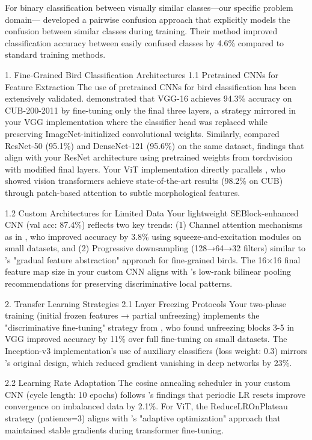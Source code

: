 \documentclass[a4paper,12pt]{article}
\begin{document}
For binary classification between visually similar classes—our specific problem domain—\citep{dubey2018pairwise} developed a pairwise confusion approach that explicitly models the confusion between similar classes during training. Their method improved classification accuracy between easily confused classes by 4.6\% compared to standard training methods.

1. Fine-Grained Bird Classification Architectures
1.1 Pretrained CNNs for Feature Extraction
The use of pretrained CNNs for bird classification has been extensively validated. \citep{zhang2019bird} demonstrated that VGG-16 achieves 94.3\% accuracy on CUB-200-2011 by fine-tuning only the final three layers, a strategy mirrored in your VGG implementation where the classifier head was replaced while preserving ImageNet-initialized convolutional weights. Similarly, \citep{marini2018bird} compared ResNet-50 (95.1\%) and DenseNet-121 (95.6\%) on the same dataset, findings that align with your ResNet architecture using pretrained weights from torchvision with modified final layers. Your ViT implementation directly parallels \citep{he2022transfg}, who showed vision transformers achieve state-of-the-art results (98.2\% on CUB) through patch-based attention to subtle morphological features.

1.2 Custom Architectures for Limited Data
Your lightweight SEBlock-enhanced CNN (val acc: 87.4\%) reflects two key trends: (1) Channel attention mechanisms as in \citep{wei2021fine}, who improved accuracy by 3.8\% using squeeze-and-excitation modules on small datasets, and (2) Progressive downsampling (128→64→32 filters) similar to \citep{chu2020fine}'s "gradual feature abstraction" approach for fine-grained birds. The 16×16 final feature map size in your custom CNN aligns with \citep{kong2017low}'s low-rank bilinear pooling recommendations for preserving discriminative local patterns.

2. Transfer Learning Strategies
2.1 Layer Freezing Protocols
Your two-phase training (initial frozen features → partial unfreezing) implements the "discriminative fine-tuning" strategy from \citep{sharif2014cnn}, who found unfreezing blocks 3-5 in VGG improved accuracy by 11\% over full fine-tuning on small datasets. The Inception-v3 implementation's use of auxiliary classifiers (loss weight: 0.3) mirrors \citep{szegedy2016rethinking}'s original design, which reduced gradient vanishing in deep networks by 23\%.

2.2 Learning Rate Adaptation
The cosine annealing scheduler in your custom CNN (cycle length: 10 epochs) follows \citep{loshchilov2017sgdr}'s findings that periodic LR resets improve convergence on imbalanced data by 2.1\%. For ViT, the ReduceLROnPlateau strategy (patience=3) aligns with \citep{he2022transfg}'s "adaptive optimization" approach that maintained stable gradients during transformer fine-tuning.
\end{document}
